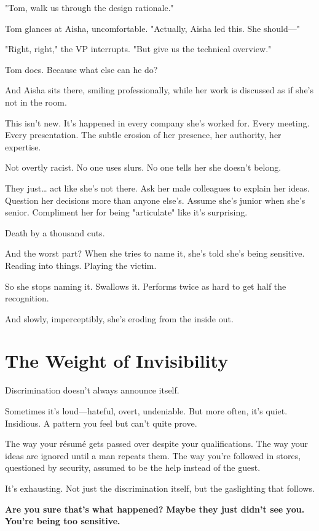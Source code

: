 \documentclass[11pt,twoside]{book}
\begin{document}
"Tom, walk us through the design rationale."

Tom glances at Aisha, uncomfortable. "Actually, Aisha led this. She should—"

"Right, right," the VP interrupts. "But give us the technical overview."

Tom does. Because what else can he do?

And Aisha sits there, smiling professionally, while her work is discussed as if she's not in the room.

This isn't new. It's happened in every company she's worked for. Every meeting. Every presentation. The subtle erosion of her presence, her authority, her expertise.

Not overtly racist. No one uses slurs. No one tells her she doesn't belong.

They just\ldots{} act like she's not there. Ask her male colleagues to explain her ideas. Question her decisions more than anyone else's. Assume she's junior when she's senior. Compliment her for being "articulate" like it's surprising.

Death by a thousand cuts.

And the worst part? When she tries to name it, she's told she's being sensitive. Reading into things. Playing the victim.

So she stops naming it. Swallows it. Performs twice as hard to get half the recognition.

And slowly, imperceptibly, she's eroding from the inside out.

\section*{The Weight of Invisibility}

Discrimination doesn't always announce itself.

Sometimes it's loud—hateful, overt, undeniable. But more often, it's quiet. Insidious. A pattern you feel but can't quite prove.

The way your résumé gets passed over despite your qualifications. The way your ideas are ignored until a man repeats them. The way you're followed in stores, questioned by security, assumed to be the help instead of the guest.

It's exhausting. Not just the discrimination itself, but the gaslighting that follows.

\textbf{Are you sure that's what happened?}
\textbf{Maybe they just didn't see you.}
\textbf{You're being too sensitive.}
\end{document}
